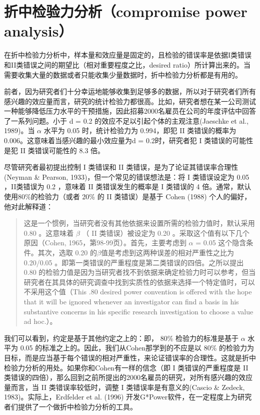 \documentclass[
  letterpaper,
  DIV=11,
  numbers=noendperiod]{scrreprt}
\begin{document}
\hypertarget{ux6298ux4e2dux68c0ux9a8cux529bux5206ux6790compromise-power-analysis}{%
\section{折中检验力分析（compromise power
analysis）}\label{ux6298ux4e2dux68c0ux9a8cux529bux5206ux6790compromise-power-analysis}}

在折中检验力分析中，样本量和效应量是固定的，且检验的错误率是依据I类错误和II类错误之间的期望比（相对重要程度之比，desired
ratio）所计算出来的。当需要收集大量的数据或者只能收集少量数据时，折中检验力分析都是有用的。

前者，因为研究者们十分幸运地能够收集到足够多的数据，所以对于研究者们所有感兴趣的效应量而言，研究的统计检验力都很高。比如，研究者想在某一公司测试一种能够降低压力水平的干预措施，因此招募2000名雇员在公司的年度评估中回答了一系列问题。小于
d = 0.2 的效应不足以引起个体的主观注意(Jaeschke et al., 1989)。当
\(\alpha\) 水平为 0.05 时，统计检验力为 0.994，即犯 II 类错误的概率为
0.006。这意味着当感兴趣的最小效应量为d = 0.2时，研究者犯 I
类错误的可能性是犯 II 类错误可能性的 8.3 倍。

尽管研究者最初提出控制 I 类错误和 II
类错误，是为了论证其错误率合理性(Neyman \& Pearson,
1933)，但一个常见的错误想法是：将 I 类错误设定为 0.05 ，II类错误为 0.2
，意味着 II 类错误发生的概率是 I 类错误的 4
倍。通常，默认使用80\%的检验力（或者 20\% 的 II 类错误）是基于 Cohen
(1988) 个人的偏好，他对此解释道：

\begin{quote}
这是一个惯例，当研究者没有其他依据来设置所需的检验力值时，默认采用 0.80
。这意味着 \(\beta\) （ II 类错误）被设定为 0.20
。采取这个值有以下几个原因（Cohen, 1965，第98-99页）。首先，主要考虑到
\(\alpha\) = 0.05 这个隐含条件。其次，选取 0.20
的\(\beta\)值是考虑到这两种误差的相对严重性之比为 0.20/0.05
。即第一类错误的严重程度是第二类错误的四倍。之所以提出 0.80
的检验力值是因为当研究者找不到依据来确定检验力时可以参考，但当研究者在其具体的研究调查中找到实质性的依据来选择一个特定值时，可以不采用这个值（This
.80 desired power convention is offered with the hope that it will be
ignored whenever an investigator can find a basis in his substantive
concerns in his specific research investigation to choose a value ad
hoc.）。
\end{quote}

我们可以看到，约定是基于其他约定之上的：即， 80\% 检验力的标准是基于
\(\alpha\) 水平为 0.05 的标准之上的。因此，我们从Cohen那学到的不应是以
80\%
的检验力为目标，而是应当基于每个错误的相对严重性，来论证错误率的合理性。这就是折中检验力分析的用处。如果你和Cohen有一样的信念（即
I 类错误的严重程度是 II
类错误的四倍），那么回到之前所提出的2000名雇员的研究，对所有感兴趣的效应量而言，当
II 类错误率较低时，调整 I 类错误率是有意义的(Cascio \& Zedeck,
1983)。实际上，Erdfelder et al. (1996)
开发G*Power软件，在一定程度上为研究者们提供了一个做折中检验力分析的工具。
\end{document}
